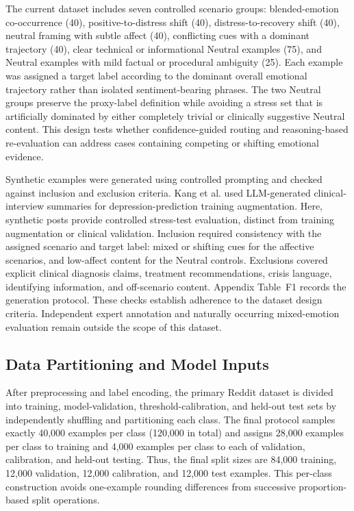 \documentclass{ieeeaccess}
\begin{document}
The current dataset includes seven controlled scenario groups: blended-emotion co-occurrence (40), positive-to-distress shift (40), distress-to-recovery shift (40), neutral framing with subtle affect (40), conflicting cues with a dominant trajectory (40), clear technical or informational Neutral examples (75), and Neutral examples with mild factual or procedural ambiguity (25). Each example was assigned a target label according to the dominant overall emotional trajectory rather than isolated sentiment-bearing phrases. The two Neutral groups preserve the proxy-label definition while avoiding a stress set that is artificially dominated by either completely trivial or clinically suggestive Neutral content. This design tests whether confidence-guided routing and reasoning-based re-evaluation can address cases containing competing or shifting emotional evidence.

Synthetic examples were generated using controlled prompting and checked against inclusion and exclusion criteria. Kang et al. \cite{ref19} used LLM-generated clinical-interview summaries for depression-prediction training augmentation. Here, synthetic posts provide controlled stress-test evaluation, distinct from training augmentation or clinical validation. Inclusion required consistency with the assigned scenario and target label: mixed or shifting cues for the affective scenarios, and low-affect content for the Neutral controls. Exclusions covered explicit clinical diagnosis claims, treatment recommendations, crisis language, identifying information, and off-scenario content. Appendix Table~F1 records the generation protocol. These checks establish adherence to the dataset design criteria. Independent expert annotation and naturally occurring mixed-emotion evaluation remain outside the scope of this dataset.

\subsection{Data Partitioning and Model Inputs}

After preprocessing and label encoding, the primary Reddit dataset is divided into training, model-validation, threshold-calibration, and held-out test sets by independently shuffling and partitioning each class. The final protocol samples exactly 40,000 examples per class (120,000 in total) and assigns 28,000 examples per class to training and 4,000 examples per class to each of validation, calibration, and held-out testing. Thus, the final split sizes are 84,000 training, 12,000 validation, 12,000 calibration, and 12,000 test examples. This per-class construction avoids one-example rounding differences from successive proportion-based split operations.
\end{document}
